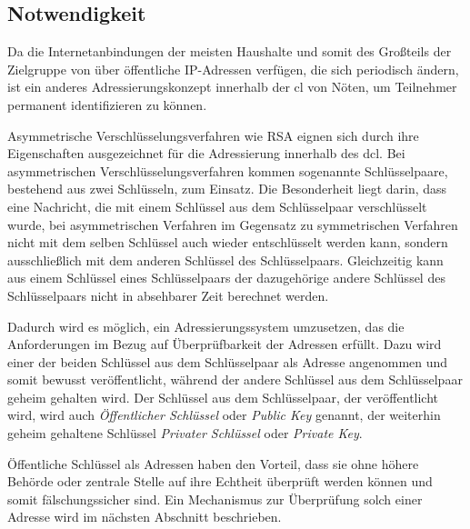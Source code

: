 
\subsection{Notwendigkeit}
Da die Internetanbindungen der meisten Haushalte und somit des Großteils der Zielgruppe von \sblit über
öffentliche IP-Adressen verfügen, die sich periodisch ändern, ist ein anderes Adressierungskonzept
innerhalb der \gls{cl} von Nöten, um Teilnehmer permanent identifizieren zu können. %

Asymmetrische Verschlüsselungsverfahren wie RSA eignen sich durch ihre Eigenschaften ausgezeichnet für
die Adressierung innerhalb des \gls{dcl}.
Bei asymmetrischen Verschlüsselungsverfahren kommen sogenannte Schlüsselpaare, bestehend aus zwei
Schlüsseln, zum Einsatz. Die Besonderheit liegt darin, dass eine Nachricht, die mit einem Schlüssel
aus dem Schlüsselpaar verschlüsselt wurde, bei asymmetrischen Verfahren im Gegensatz zu symmetrischen
Verfahren nicht mit dem selben Schlüssel auch wieder entschlüsselt werden kann, sondern ausschließlich
mit dem anderen Schlüssel des Schlüsselpaars.
Gleichzeitig kann aus einem Schlüssel eines Schlüsselpaars der dazugehörige andere Schlüssel des
Schlüsselpaars nicht in absehbarer Zeit berechnet werden.

Dadurch wird es möglich, ein Adressierungssystem umzusetzen, das die Anforderungen im Bezug auf
Überprüfbarkeit der Adressen erfüllt. Dazu wird einer der beiden Schlüssel aus dem Schlüsselpaar
als Adresse angenommen und somit bewusst veröffentlicht, während der andere Schlüssel aus dem
Schlüsselpaar geheim gehalten wird.
Der Schlüssel aus dem Schlüsselpaar, der veröffentlicht wird, wird auch \emph{Öffentlicher Schlüssel}
oder \emph{Public Key} genannt, der weiterhin geheim gehaltene Schlüssel \emph{Privater Schlüssel} oder
\emph{Private Key}.

Öffentliche Schlüssel als Adressen haben den Vorteil, dass sie ohne höhere Behörde oder zentrale Stelle
auf ihre Echtheit überprüft werden können und somit fälschungssicher sind. Ein Mechanismus zur
Überprüfung solch einer Adresse wird im nächsten Abschnitt beschrieben.

